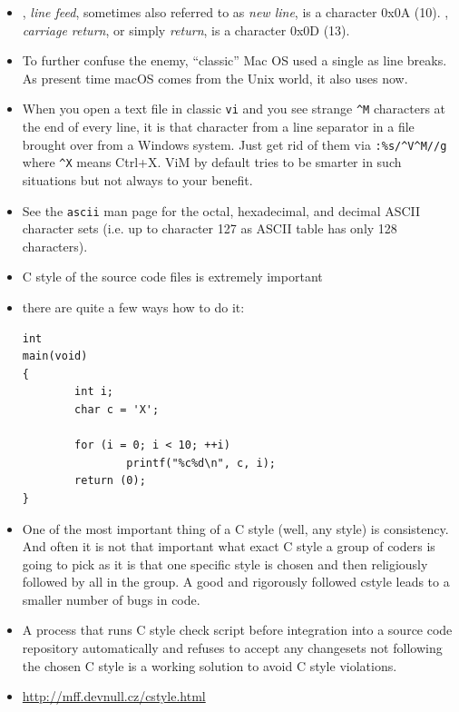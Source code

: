 \label{NEWLINECHAR}

\begin{itemize}
\item {}, \emph{line feed}, sometimes also referred to as \emph{new
line}, is a character 0x0A (10).  , \emph{carriage return}, or simply
\emph{return}, is a character 0x0D (13).
\item To further confuse the enemy, ``classic'' Mac OS used a single 
as line breaks.  As present time macOS comes from the Unix world, it also uses
 now.
\item When you open a text file in classic \texttt{vi} and you see strange
\verb|^M| characters at the end of every line, it is that  character
from a line separator in a file brought over from a Windows system.  Just get
rid of them via \verb|:%s/^V^M//g| where \verb|^X| means Ctrl+X.  ViM by default
tries to be smarter in such situations but not always to your benefit.
\item See the \texttt{ascii} man page for the octal, hexadecimal, and decimal
ASCII character sets (i.e. up to character 127 as ASCII table has only 128
characters).
\end{itemize}



\begin{slide}
\begin{itemize}
\item C style of the source code files is extremely important
\item there are quite a few ways how to do it:

\begin{verbatim}
int
main(void)
{
        int i;
        char c = 'X';

        for (i = 0; i < 10; ++i)
                printf("%c%d\n", c, i);
        return (0);
}
\end{verbatim}
\end{itemize}
\end{slide}

\begin{itemize}
\item One of the most important thing of a C style (well, any style) is
consistency.  And often it is not that important what exact C style a group
of coders is going to pick as it is that one specific style is chosen and then
religiously followed by all in the group. A good and rigorously followed cstyle
leads to a smaller number of bugs in code.
\item A process that runs C style check script before integration into a source
code repository automatically and refuses to accept any changesets not following
the chosen C style is a working solution to avoid C style violations.
\item \url{http://mff.devnull.cz/cstyle.html}
\end{itemize}

